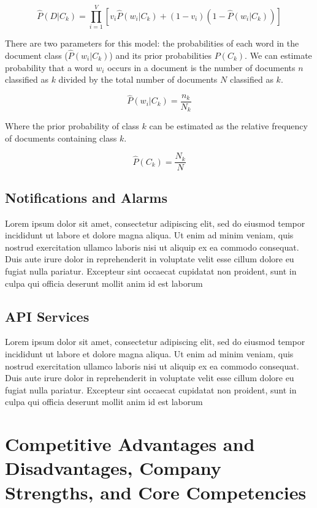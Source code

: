\[
  \hat{P}(D|C_{k}) = \prod_{i=1}^{V}[v_{i}\hat{P}(w_{i}|C_{k}) + (1 - v_{i})(1 - \hat{P}(w_{i}|C_{k}))]
\]

There are two parameters for this model: the probabilities of each word in the document class (\(\hat{P}(w_{i}|C_{k})\)) and its prior probabilities \(P(C_{k})\). We can estimate probability that a word \(w_{i}\) occurs in a document is the number of documents \(n\) classified as \(k\) divided by the total number of documents \(N\) classified as \(k\).

\[
  \hat{P}(w_{i}|C_{k}) = \frac{n_{k}}{N_{k}}
\]

Where the prior probability of class \(k\) can be estimated as the relative frequency of documents containing class \(k\).

\[
  \hat{P}(C_{k}) = \frac{N_{k}}{N}
\]

\subsection{Notifications and Alarms}

Lorem ipsum dolor sit amet, consectetur adipiscing elit, sed do eiusmod tempor incididunt ut labore et dolore magna aliqua. Ut enim ad minim veniam, quis nostrud exercitation ullamco laboris nisi ut aliquip ex ea commodo consequat. Duis aute irure dolor in reprehenderit in voluptate velit esse cillum dolore eu fugiat nulla pariatur. Excepteur sint occaecat cupidatat non proident, sunt in culpa qui officia deserunt mollit anim id est laborum

\subsection{API Services}

Lorem ipsum dolor sit amet, consectetur adipiscing elit, sed do eiusmod tempor incididunt ut labore et dolore magna aliqua. Ut enim ad minim veniam, quis nostrud exercitation ullamco laboris nisi ut aliquip ex ea commodo consequat. Duis aute irure dolor in reprehenderit in voluptate velit esse cillum dolore eu fugiat nulla pariatur. Excepteur sint occaecat cupidatat non proident, sunt in culpa qui officia deserunt mollit anim id est laborum

\section{Competitive Advantages and Disadvantages, Company Strengths, and Core Competencies}

